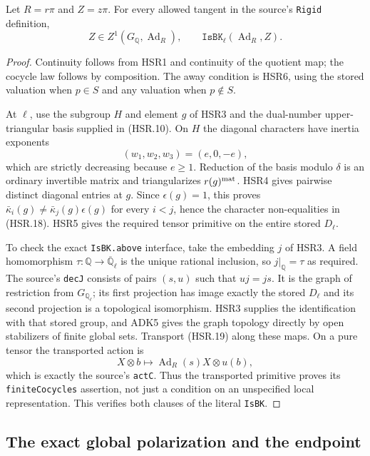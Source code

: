 \begin{proposition}
\label{claim:HSR7}
Let $R=r\pi$ and $Z=z\pi$.  For every allowed tangent in the
source's \texttt{Rigid} definition,
\[
       Z\in Z^1(G_{\mathbb Q},\operatorname{Ad}_R),
       \qquad \texttt{IsBK}_{\ell}(\operatorname{Ad}_R,Z).
 \tag{HSR.21}
\]
\end{proposition}
\begin{proof}
Continuity follows from HSR1 and continuity of the quotient map;
the cocycle law follows by composition.  The away condition is
HSR6, using the stored valuation when $p\in S$ and any valuation
when $p\notin S$.

At $\ell$, use the subgroup $H$ and element $g$ of HSR3 and the
dual-number upper-triangular basis supplied in (HSR.10).  On $H$
the diagonal characters have inertia exponents
\[
                         (w_1,w_2,w_3)=(e,0,-e),
 \tag{HSR.22}
\]
which are strictly decreasing because $e\ge1$.  Reduction of
the basis modulo $\delta$ is an ordinary invertible matrix and
triangularizes $r(g)^{\rm mat}$.  HSR4 gives pairwise distinct
diagonal entries at $g$.  Since $\epsilon(g)=1$, this proves
$\bar\kappa_i(g)\ne\bar\kappa_j(g)\epsilon(g)$ for every
$i<j$, hence the character non-equalities in (HSR.18).
HSR5 gives the required tensor primitive on the entire stored
$D_\ell$.

To check the exact \texttt{IsBK.above} interface, take the embedding
$j$ of HSR3.  A field homomorphism
$\tau:\mathbb Q\to\overline{\mathbb Q}_\ell$ is the unique
rational inclusion, so $j|_{\mathbb Q}=\tau$ as required.
The source's \texttt{decJ} consists of pairs $(s,u)$ such that
$u j=j s$.  It is the graph of restriction from
$G_{\mathbb Q_\ell}$; its first projection has image exactly
the stored $D_\ell$ and its second projection is a topological
isomorphism.  HSR3 supplies the identification with that stored
group, and ADK5 gives the graph topology directly by open
stabilizers of finite global sets.  Transport (HSR.19) along these
maps.  On a pure tensor the transported action is
\[
            X\otimes b\longmapsto
            \operatorname{Ad}_R(s)X\otimes u(b),
\]
which is exactly the source's \texttt{actC}.  Thus the transported
primitive proves its \texttt{finiteCocycles} assertion, not just
a condition on an unspecified local representation.  This
verifies both clauses of the literal \texttt{IsBK}.
\end{proof}

\subsection{The exact global polarization and the endpoint}

